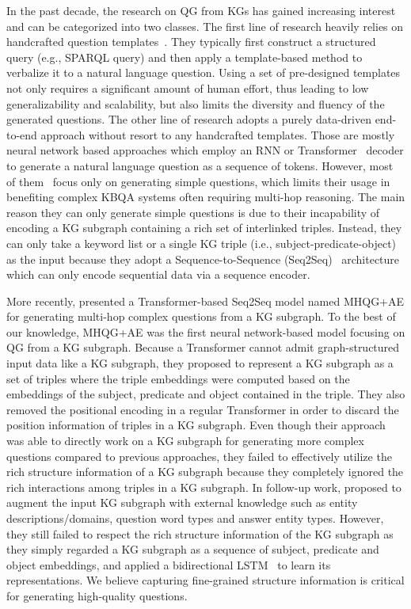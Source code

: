 \documentclass[journal]{IEEEtran}
\begin{document}
In the past decade, the research on QG from KGs has gained increasing interest and can be categorized into two classes. The first line of research heavily relies on handcrafted question templates~\cite{seyler2015generating,song2016question,seyler2017knowledge}. They typically first construct a structured query (e.g., SPARQL query) and then apply a template-based method to verbalize it to a natural language question. Using a set of pre-designed templates not only requires a significant amount of human effort, thus leading to low generalizability and scalability, but also limits the diversity and fluency of the generated questions. 
The other line of research adopts a purely data-driven end-to-end approach without resort to any handcrafted templates. Those are mostly neural network based approaches which employ an RNN or Transformer~\cite{vaswani2017attention} decoder to generate a natural language question as a sequence of tokens.
However, most of them~\cite{serban2016generating,reddy2017generating,elsahar2018zero,liu2019generating,hu2022generating} focus only on generating simple questions, which limits their usage in benefiting complex KBQA systems often requiring multi-hop reasoning. The main reason they can only generate simple questions is due to their incapability of encoding a KG subgraph containing a rich set of interlinked triples. Instead, they can only take a keyword list or a single KG triple (i.e., subject-predicate-object) as the input because they adopt a Sequence-to-Sequence (Seq2Seq)~\cite{sutskever2014sequence,cho2014learning} architecture which can only encode sequential data via a sequence encoder.


More recently, \cite{kumar2019difficulty} presented a Transformer-based Seq2Seq model named MHQG+AE for generating multi-hop complex questions from a KG subgraph. To the best of our knowledge, MHQG+AE was the first neural network-based model focusing on QG from a KG subgraph.
Because a Transformer cannot admit graph-structured input data like a KG subgraph, they proposed to represent a KG subgraph as a set of triples where the triple embeddings were computed based on the embeddings of the subject, predicate and object contained in the triple. They also removed the positional encoding in a regular Transformer in order to discard the position information of triples in a KG subgraph. Even though their approach was able to directly work on a KG subgraph for generating more complex questions compared to previous approaches, they failed to effectively utilize the rich structure information of a KG subgraph because they completely ignored the rich interactions among triples in a KG subgraph. 
In follow-up work, \cite{sheng2020knowledge} proposed to augment the input KG subgraph with external knowledge such as entity descriptions/domains, question word types and answer entity types.
However, they still failed to respect the rich structure information of the KG subgraph as they simply regarded a KG subgraph as a sequence of subject, predicate and object embeddings, and applied a bidirectional LSTM~\cite{hochreiter1997long} to learn its representations.
We believe capturing fine-grained structure information is critical for generating high-quality questions.
\end{document}
